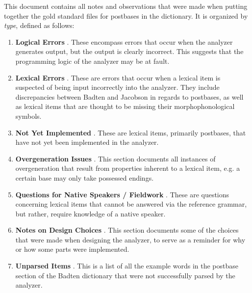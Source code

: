 \documentclass{article}
\begin{document}
This document contains all notes and observations that were made when putting together the gold standard files for postbases in the dictionary.
%
It is organized by \textit{type}, defined as follows:
%
\begin{enumerate}
\item \textbf{Logical Errors} . These encompass errors that occur when the analyzer generates output, but the output is clearly incorrect. This suggests that the programming logic of the analyzer may be at fault.

\item \textbf{Lexical Errors} . These are errors that occur when a lexical item is suspected of being input incorrectly into the analyzer. They include discrepancies between Badten and Jacobson in regards to postbases, as well as lexical items that are thought to be missing their morphophonological symbols.

\item \textbf{Not Yet Implemented} . These are lexical items, primarily postbases, that have not yet been implemented in the analyzer.

\item \textbf{Overgeneration Issues} . This section documents all instances of overgeneration that result from properties inherent to a lexical item, e.g. a certain base may only take possessed endings.

\item \textbf{Questions for Native Speakers / Fieldwork} . These are questions concerning lexical items that cannot be answered via the reference grammar, but rather, require knowledge of a native speaker.

\item \textbf{Notes on Design Choices} . This section documents some of the choices that were made when designing the analyzer, to serve as a reminder for why or how some parts were implemented.

\item \textbf{Unparsed Items} . This is a list of all the example words in the postbase section of the Badten dictionary that were not successfully parsed by the analyzer.
\end{enumerate}

\pagebreak

\end{document}
